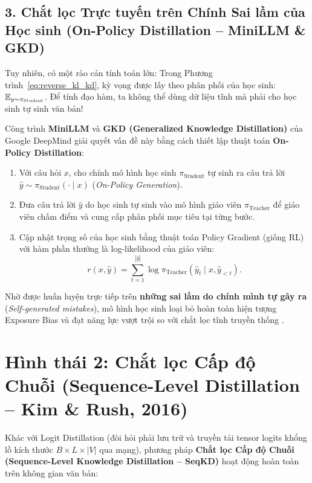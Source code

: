 \subsection{3. Chắt lọc Trực tuyến trên Chính Sai lầm của Học sinh (On-Policy Distillation -- MiniLLM \& GKD)}
Tuy nhiên, có một rào cản tính toán lớn: Trong Phương trình~\eqref{eq:reverse_kl_kd}, kỳ vọng được lấy theo phân phối của học sinh: $\operatorname{\mathbb{E}}_{y \sim \pi_{\text{Student}}}$. Để tính đạo hàm, ta không thể dùng dữ liệu tĩnh mà phải cho học sinh tự sinh văn bản!

Công trình \textbf{MiniLLM} \citep{gu2024minillm} và \textbf{GKD (Generalized Knowledge Distillation)} của Google DeepMind \citep{agarwal2024onpolicy} giải quyết vấn đề này bằng cách thiết lập thuật toán \textbf{On-Policy Distillation}:
\begin{enumerate}[leftmargin=1.2cm]
    \item Với câu hỏi $x$, cho chính mô hình học sinh $\pi_{\text{Student}}$ tự sinh ra câu trả lời $\hat{y} \sim \pi_{\text{Student}}(\cdot \mid x)$ (\textit{On-Policy Generation}).
    \item Đưa câu trả lời $\hat{y}$ do học sinh tự sinh vào mô hình giáo viên $\pi_{\text{Teacher}}$ để giáo viên chấm điểm và cung cấp phân phối mục tiêu tại từng bước.
    \item Cập nhật trọng số của học sinh bằng thuật toán Policy Gradient (giống RL) với hàm phần thưởng là log-likelihood của giáo viên:
    \begin{equation}
        r(x, \hat{y}) = \sum_{t=1}^{|\hat{y}|} \log \pi_{\text{Teacher}}(\hat{y}_t \mid x, \hat{y}_{<t}).
    \end{equation}
\end{enumerate}
Nhờ được huấn luyện trực tiếp trên \textbf{những sai lầm do chính mình tự gây ra} (\textit{Self-generated mistakes}), mô hình học sinh loại bỏ hoàn toàn hiện tượng Exposure Bias và đạt năng lực vượt trội so với chắt lọc tĩnh truyền thống \citep{agarwal2024onpolicy}.

\section{Hình thái 2: Chắt lọc Cấp độ Chuỗi (Sequence-Level Distillation -- Kim \& Rush, 2016)}
\label{sec:sequence_distillation}

Khác với Logit Distillation (đòi hỏi phải lưu trữ và truyền tải tensor logits khổng lồ kích thước $B \times L \times |V|$ qua mạng), phương pháp \textbf{Chắt lọc Cấp độ Chuỗi (Sequence-Level Knowledge Distillation -- SeqKD)} \citep{kim2016sequence} hoạt động hoàn toàn trên không gian văn bản:

